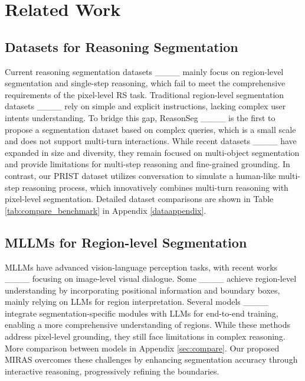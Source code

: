 \section{Related Work}
\vspace{-5pt}
\subsection{Datasets for Reasoning Segmentation}
\vspace{-5pt}
Current reasoning segmentation datasets ____ mainly focus on region-level segmentation and single-step reasoning, which fail to meet the comprehensive requirements of the pixel-level RS task.
Traditional region-level segmentation datasets ____ rely on simple and explicit instructions, lacking complex user intents understanding. To bridge this gap, ReasonSeg ____ is the first to propose a segmentation dataset based on complex queries, which is a small scale and does not support multi-turn interactions. While recent datasets ____ have expanded in size and diversity, they remain focused on multi-object segmentation and provide limitations for multi-step reasoning and fine-grained grounding. In contrast, our PRIST dataset utilizes conversation to simulate a human-like multi-step reasoning process, which innovatively combines multi-turn reasoning with pixel-level segmentation. %
Detailed dataset comparisons are shown in Table \ref{tab:compare_benchmark} in Appendix \ref{dataappendix}.
\vspace{-5pt}
\subsection{MLLMs for Region-level Segmentation} 
\vspace{-5pt}
MLLMs have advanced vision-language perception tasks, with recent works 
____ focusing on image-level visual dialogue. Some ____ achieve region-level understanding by incorporating positional information and boundary boxes, mainly relying on LLMs for region interpretation. Several models ____ integrate segmentation-specific modules with LLMs for end-to-end training, enabling a more comprehensive understanding of regions. While these methods address pixel-level grounding, they still face limitations in complex reasoning. More comparison between models in Appendix \ref{sec:compare}. Our proposed MIRAS overcomes these challenges by enhancing segmentation accuracy through interactive reasoning, progressively refining the boundaries. 
\vspace{-2pt}